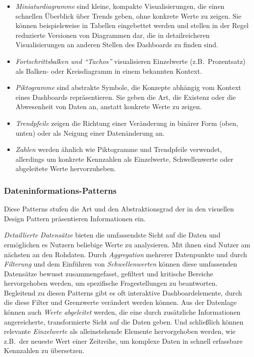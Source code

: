 \begin{itemize}
    \item \emph{Miniaturdiagramme} sind kleine, kompakte Visualisierungen, die einen schnellen Überblick über Trends geben, ohne konkrete Werte zu zeigen.
    Sie können beispielsweise in Tabellen eingebettet werden und stellen in der Regel reduzierte Versionen von Diagrammen dar, die in detailreicheren Visualisierungen an anderen Stellen des Dashboards zu finden sind.
    \item \emph{Fortschrittsbalken und "`Tachos"'} visualisieren Einzelwerte (z.B.\ Prozentsatz) als Balken- oder Kreisdiagramm in einem bekannten Kontext.
    \item \emph{Piktogramme} sind abstrakte Symbole, die Konzepte abhängig vom Kontext eines Dashboards repräsentieren.
    Sie geben die Art, die Existenz oder die Abwesenheit von Daten an, anstatt konkrete Werte zu zeigen.
    \item \emph{Trendpfeile} zeigen die Richtung einer Veränderung in binärer Form (oben, unten) oder als Neigung einer Datenänderung an.
    \item \emph{Zahlen} werden ähnlich wie Piktogramme und Trendpfeile verwendet, allerdings um konkrete Kennzahlen als Einzelwerte, Schwellenwerte oder abgeleitete Werte hervorzuheben.
\end{itemize}

\subsubsection{Dateninformations-Patterns}\label{subsubsec:data-information-patterns}

Diese Patterns stufen die Art und den Abstraktionsgrad der in den visuellen Design Pattern präsentieren Informationen ein.

\emph{Detaillierte Datensätze} bieten die umfassendste Sicht auf die Daten und ermöglichen es Nutzern beliebige Werte zu analysieren.
Mit ihnen sind Nutzer am nächsten an den Rohdaten.
Durch \emph{Aggregation} mehrerer Datenpunkte und durch \emph{Filterung} und dem Einführen von \emph{Schwellenwerten} können diese umfassenden Datensätze bewusst zusammengefasst, gefiltert und kritische Bereiche hervorgehoben werden, um spezifische Fragestellungen zu beantworten.
Begleitend zu diesen Patterns gibt es oft interaktive Dashboardelemente, durch die diese Filter und Grenzwerte verändert werden können.
Aus der Datenlage können auch \emph{Werte abgeleitet} werden, die eine durch zusätzliche Informationen angereicherte, transformierte Sicht auf die Daten geben.
Und schließlich können relevante \emph{Einzelwerte} als alleinstehende Elemente hervorgehoben werden, wie z.B.\ der neueste Wert einer Zeitreihe, um komplexe Daten in schnell erfassbare Kennzahlen zu übersetzen.

